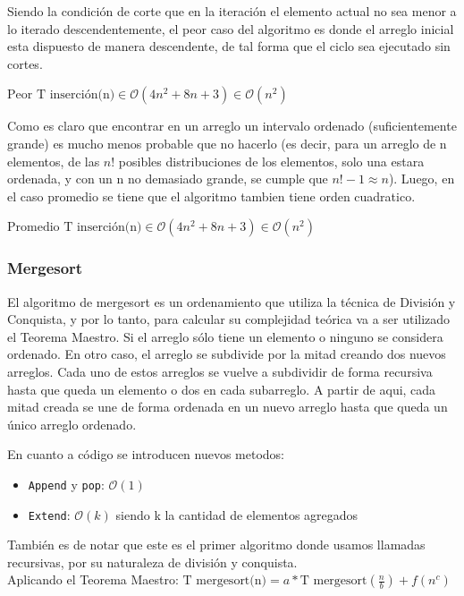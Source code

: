\documentclass[article,a4paper]{article}
\begin{document}
Siendo la condición de corte que en la iteración el elemento actual no sea menor a lo iterado descendentemente, el peor caso del algoritmo es donde el arreglo inicial esta dispuesto de manera descendente, de tal forma que el ciclo sea ejecutado sin cortes.

$\mbox{Peor T inserción(n)} \in \mathcal O(4n^2 + 8n + 3) \in \mathcal O(n^2)$

Como es claro que encontrar en un arreglo un intervalo ordenado (suficientemente grande) es mucho menos probable que no hacerlo (es decir, para un arreglo de n elementos, de las $n!$ posibles distribuciones de los elementos, solo una estara ordenada, y con un n no demasiado grande, se cumple que $n!-1 \approx n$). Luego, en el caso promedio se tiene que el algoritmo tambien tiene orden cuadratico.

$\mbox{Promedio T inserción(n)} \in \mathcal O(4n^2 + 8n + 3) \in \mathcal O(n^2)$

\subsubsection{Mergesort}

El algoritmo de mergesort es un ordenamiento que utiliza la técnica de División y Conquista, y por lo tanto, para calcular su complejidad teórica va a ser utilizado el Teorema Maestro. Si el arreglo sólo tiene un elemento o ninguno se considera ordenado. En otro caso, el arreglo se subdivide por la mitad creando dos nuevos arreglos. Cada uno de estos arreglos se vuelve a subdividir de forma recursiva hasta que queda un elemento o dos en cada subarreglo. A partir de aqui, cada mitad creada se une de forma ordenada en un nuevo arreglo hasta que queda un único arreglo ordenado.

En cuanto a código se introducen nuevos metodos:

\begin{itemize}
\item \texttt{Append} y \texttt{pop}: $\mathcal O(1)$
\item \texttt{Extend}: $\mathcal O(k)$ siendo k la cantidad de elementos agregados 
\end{itemize}

También es de notar que este es el primer algoritmo donde usamos llamadas recursivas, por su naturaleza de división y conquista.\\

Aplicando el Teorema Maestro: $\mbox{T mergesort(n)} = a * \mbox{T mergesort}(\frac{n}{b}) + f(n^c)$
\end{document}
